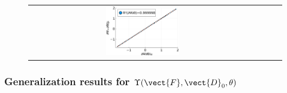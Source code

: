 \begin{figure}[hbtp!]
\begin{tabular}{cccc}
		\includegraphics[width=0.33\textwidth]{Figures/ModelsStudy/_MooneyRivlin_ElectricSaturation_theta_CorrelationTest} \\
	\end{tabular}
	\caption{}
	\label{fig:example 1 energy balance}
\end{figure}



\clearpage

\subsubsection{Generalization results for $\Upsilon(\vect{F},\vect{D}_0,\theta)$}



